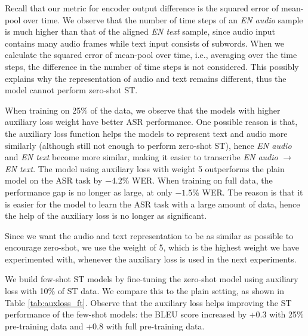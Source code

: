 \documentclass[conference]{IEEEtran}
\begin{document}
	Recall that our metric for encoder output difference is the squared error of mean-pool over time. We observe that the number of time steps of an \textit{EN audio} sample is much higher than that of the aligned \textit{EN text} sample, since audio input contains many audio frames while text input consists of subwords. When we calculate the squared error of mean-pool over time, i.e., averaging over the time steps, the difference in the number of time steps is not considered. This possibly explains why the representation of audio and text remains different, thus the model cannot perform zero-shot ST.
	
	When training on 25\% of the data, we observe that the models with higher auxiliary loss weight have better ASR performance. One possible reason is that, the auxiliary loss function helps the models to represent text and audio more similarly (although still not enough to perform zero-shot ST), hence \textit{EN audio} and \textit{EN text} become more similar, making it easier to transcribe \textit{EN audio} $\rightarrow$ \textit{EN text}. The model using auxiliary loss with weight 5 outperforms the plain model on the ASR task by $-4.2$\% WER. When training on full data, the performance gap is no longer as large, at only $-1.5$\% WER. The reason is that it is easier for the model to learn the ASR task with a large amount of data, hence the help of the auxiliary loss is no longer as significant.
	
	Since we want the audio and text representation to be as similar as possible to encourage zero-shot, we use the weight of 5, which is the highest weight we have experimented with, whenever the auxiliary loss is used in the next experiments.
	
	We build few-shot ST models by fine-tuning the zero-shot model using auxiliary loss with 10\% of ST data. We compare this to the plain setting, as shown in Table \ref{tab:auxloss_ft}. Observe that the auxiliary loss helps improving the ST performance of the few-shot models: the BLEU score increased by +0.3 with 25\% pre-training data and +0.8 with full pre-training data.
\end{document}
